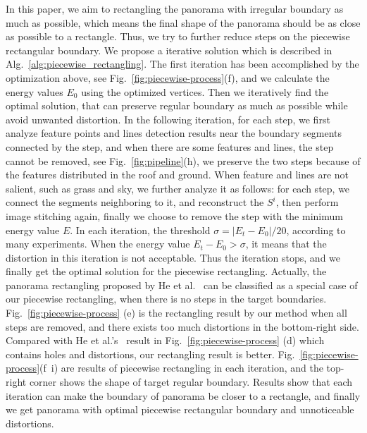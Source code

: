 \documentclass[10pt,journal,compsoc]{IEEEtran}
\begin{document}
In this paper, we aim to rectangling the panorama with irregular boundary as much as possible, which means the final shape of the panorama should be as close as possible to a rectangle.
Thus, we try to further reduce steps on the piecewise rectangular boundary.
We propose a iterative solution which is described in Alg.~\ref{alg:piecewise_rectangling}.
The first iteration has been accomplished by the optimization above, see Fig.~\ref{fig:piecewise-process}(f),  and we calculate the energy values $E_0$ using the optimized vertices.
Then we iteratively find the optimal solution, that can preserve regular boundary as much as possible while avoid unwanted distortion.
In the following iteration, for each step, we first analyze feature points and lines detection results near the boundary segments connected by the step, and when there are some features and lines, the step cannot be removed, see Fig.~\ref{fig:pipeline}(h), we preserve the two steps because of the features distributed in the roof and ground.
When feature and lines are not salient, such as grass and sky, we further analyze it as follows: for each step, we connect the segments neighboring to it, and reconstruct the  $S^i$, then perform image stitching again, finally we choose to remove the step with the minimum energy value $E$.
In each iteration, the threshold $\sigma=|E_t-E_0|/20$, according to many experiments.
When the energy value $E_t-E_0 > \sigma$, it means that the distortion in this iteration is not acceptable. Thus the iteration stops, and we finally get the optimal solution for the piecewise rectangling.
Actually, the panorama rectangling proposed by He et al.~\cite{journals/tog/HeC013} can be classified as a special case of our piecewise rectangling, when there is no steps in the target boundaries.
Fig.~\ref{fig:piecewise-process} (e) is the rectangling result by our method when all steps are removed, and there exists too much distortions in the bottom-right side.
Compared with He et al.'s~\cite{journals/tog/HeC013} result in Fig.~\ref{fig:piecewise-process} (d) which contains holes and distortions, our rectangling result is better.
Fig.~\ref{fig:piecewise-process}(f~i) are results of piecewise rectangling in each iteration, and the top-right corner shows the shape of target regular boundary.
Results show that each iteration can make the boundary of panorama be closer to a rectangle, and finally we get panorama with optimal piecewise rectangular boundary and unnoticeable distortions.
\end{document}
